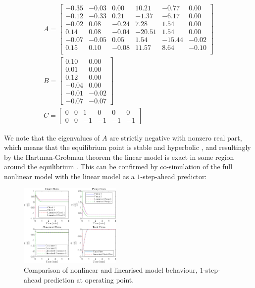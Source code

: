 \begin{equation}\label{eq:LinearisedModelWithTank}
\begin{gathered}
	A = \begin{bmatrix}
		-0.35 & -0.03 & 0.00 & 10.21 & -0.77 & 0.00\\
		-0.12 & -0.33 & 0.21 & -1.37 & -6.17  & 0.00\\
		-0.02 & 0.08 & -0.24 & 7.28 & 1.54 & 0.00\\
		0.14 & 0.08 & -0.04 & -20.51 & 1.54 & 0.00\\
		-0.07 & -0.05 & 0.05 & 1.54 & -15.44 &   -0.02\\
		0.15 & 0.10 & -0.08 & 11.57 & 8.64 & -0.10\\
	\end{bmatrix} \\
	B = \begin{bmatrix}
		0.10 & 0.00\\
		0.01 & 0.00 \\
		0.12 & 0.00 \\
		-0.04 & 0.00 \\
		-0.01 & -0.02\\
		-0.07 & -0.07
	\end{bmatrix}
\\
		C = \begin{bmatrix} 
			0 & 0 & 1 & 0 & 0 & 0	\\		
			0 & 0 & -1 & -1 & -1 & -1
		\end{bmatrix}
\end{gathered}
\end{equation}

We note that the eigenvalues of $A$ are strictly negative with nonzero real part, which means that the equilibrium point is stable and hyperbolic \cite{Khalil}, and resultingly by the Hartman-Grobman theorem the linear model is exact in some region around the equilibrium \cite{Perko2001}. This can be confirmed by co-simulation of the full nonlinear model with the linear model as a $1$-step-ahead predictor:


\begin{figure}[h]
	\centering
	\includegraphics[height = 4cm,width=\linewidth]{Graphics/NominalFlows.pdf}
	\caption{Comparison of nonlinear and linearised model behaviour, $1$-step-ahead prediction at operating point.}
	\label{fig:CompNonLinEQ}
\end{figure}

